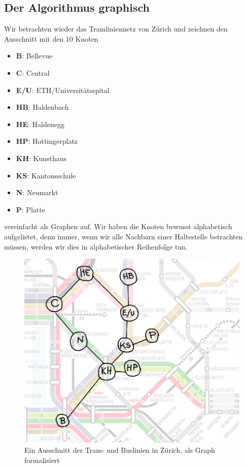 \subsection{Der Algorithmus graphisch}
Wir betrachten wieder das Tramliniennetz von Zürich und zeichnen den Ausschnitt mit den 10 Knoten
\begin{multicols}{2}
\begin{itemize}
    \item {\bf{B}}: Bellevue
    \item {\bf{C}}: Central
    \item {\bf{E/U}}: ETH/Universitätsspital
    \item {\bf{HB}}: Haldenbach
    \item {\bf{HE}}: Haldenegg
    \item {\bf{HP}}: Hottingerplatz
    \item {\bf{KH}}: Kunsthaus
    \item {\bf{KS}}: Kantonsschule
    \item {\bf{N}}: Neumarkt
    \item {\bf{P}}: Platte

\end{itemize}
\end{multicols}
\noindent vereinfacht als Graphen auf. Wir haben die Knoten bewusst alphabetisch aufgelistet, denn immer, wenn wir alle Nachbarn einer Haltestelle betrachten müssen, werden wir dies in alphabetischer Reihenfolge tun.
\begin{figure}[H]
    \centering
    \includegraphics[width=\linewidth]{Pictures/Tram2.PNG}
    \caption{Ein Ausschnitt der Tram- und Buslinien in Zürich, als Graph formalisiert}
\end{figure}

